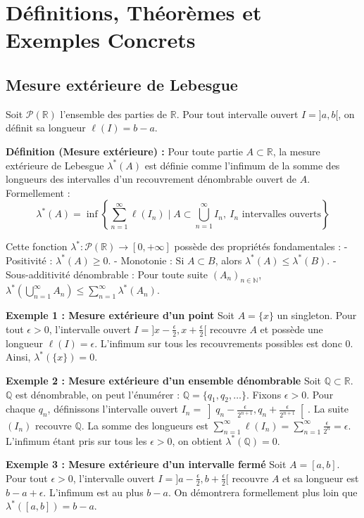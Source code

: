 \documentclass[11pt,a4paper]{article}
\begin{document}
\section{Définitions, Théorèmes et Exemples Concrets}

\subsection{Mesure extérieure de Lebesgue}

Soit $\mathcal{P}(\mathbb{R})$ l'ensemble des parties de $\mathbb{R}$.
Pour tout intervalle ouvert $I = ]a, b[$, on définit sa longueur $\ell(I) = b - a$.

\textbf{Définition (Mesure extérieure) :}
Pour toute partie $A \subset \mathbb{R}$, la mesure extérieure de Lebesgue $\lambda^*(A)$ est définie comme l'infimum de la somme des longueurs des intervalles d'un recouvrement dénombrable ouvert de $A$. Formellement :
$$\lambda^*(A) = \inf \left\lbrace \sum_{n=1}^\infty \ell(I_n) \mid A \subset \bigcup_{n=1}^\infty I_n, \ I_n \text{ intervalles ouverts} \right\rbrace$$

Cette fonction $\lambda^* : \mathcal{P}(\mathbb{R}) \to [0, +\infty]$ possède des propriétés fondamentales :
- Positivité : $\lambda^*(A) \ge 0$.
- Monotonie : Si $A \subset B$, alors $\lambda^*(A) \le \lambda^*(B)$.
- Sous-additivité dénombrable : Pour toute suite $(A_n)_{n \in \mathbb{N}}$, $\lambda^*\left(\bigcup_{n=1}^\infty A_n\right) \le \sum_{n=1}^\infty \lambda^*(A_n)$.

\textbf{Exemple 1 : Mesure extérieure d'un point}
Soit $A = \{x\}$ un singleton. Pour tout $\epsilon > 0$, l'intervalle ouvert $I = ]x - \frac{\epsilon}{2}, x + \frac{\epsilon}{2}[$ recouvre $A$ et possède une longueur $\ell(I) = \epsilon$. L'infimum sur tous les recouvrements possibles est donc $0$. Ainsi, $\lambda^*(\{x\}) = 0$.

\textbf{Exemple 2 : Mesure extérieure d'un ensemble dénombrable}
Soit $\mathbb{Q} \subset \mathbb{R}$. $\mathbb{Q}$ est dénombrable, on peut l'énumérer : $\mathbb{Q} = \{q_1, q_2, \dots\}$. Fixons $\epsilon > 0$. Pour chaque $q_n$, définissons l'intervalle ouvert $I_n = \left] q_n - \frac{\epsilon}{2^{n+1}}, q_n + \frac{\epsilon}{2^{n+1}} \right[$. La suite $(I_n)$ recouvre $\mathbb{Q}$.
La somme des longueurs est $\sum_{n=1}^\infty \ell(I_n) = \sum_{n=1}^\infty \frac{\epsilon}{2^n} = \epsilon$. L'infimum étant pris sur tous les $\epsilon > 0$, on obtient $\lambda^*(\mathbb{Q}) = 0$.

\textbf{Exemple 3 : Mesure extérieure d'un intervalle fermé}
Soit $A = [a, b]$. Pour tout $\epsilon > 0$, l'intervalle ouvert $I = ]a - \frac{\epsilon}{2}, b + \frac{\epsilon}{2}[$ recouvre $A$ et sa longueur est $b - a + \epsilon$. L'infimum est au plus $b - a$. On démontrera formellement plus loin que $\lambda^*([a, b]) = b - a$.
\end{document}
